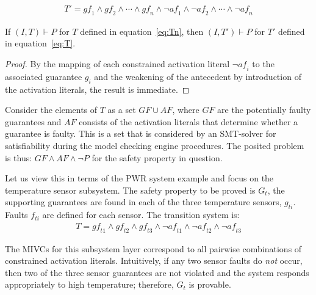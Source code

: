 \begin{gather}
T' = \mathit{gf}_1 \land \mathit{gf}_2 \land \cdots \land \mathit{gf}_n \land \neg \mathit{af}_1 \land \neg \mathit{af}_2 \land \cdots \land \neg \mathit{af}_n
\label{eq:T}
\end{gather}

\begin{theorem} If $(I,T) \vdash P$ for $T$ defined in equation~\ref{eq:Tn}, then $(I,T') \vdash P$ for $T'$ defined in equation~\ref{eq:T}.
\begin{proof}
By the mapping of each constrained activation literal $\neg \mathit{af}_i$ to the associated guarantee $g_i$ and the weakening of the antecedent by introduction of the activation literals, the result is immediate.
\end{proof}
\end{theorem}

Consider the elements of $T$ as a set $GF \cup AF$, where $GF$ are the potentially faulty guarantees and $AF$ consists of the activation literals that determine whether a guarantee is faulty. This is a set that is considered by an SMT-solver for satisfiability during the model checking engine procedures. The posited problem is thus: $GF \land AF \land \neg P$ for the safety property in question. %

Let us view this in terms of the PWR system example and focus on the temperature sensor subsystem. The safety property to be proved is $G_t$, the supporting guarantees are found in each of the three temperature sensors, $g_{ti}$. Faults $f_{ti}$ are defined for each sensor. The transition system is: 
\begin{gather*}
T = \mathit{gf}_{t1} \land \mathit{gf}_{t2} \land \mathit{gf}_{t3}  \land \neg \mathit{af}_{t1} \land \neg \mathit{af}_{t2} \land \neg \mathit{af}_{t3}
\end{gather*}

The MIVCs for this subsystem layer correspond to all pairwise combinations of constrained activation literals. Intuitively, if any two sensor faults do {\em not} occur, then two of the three sensor guarantees are not violated and the system responds appropriately to high temperature; therefore, $G_t$ is provable. 

